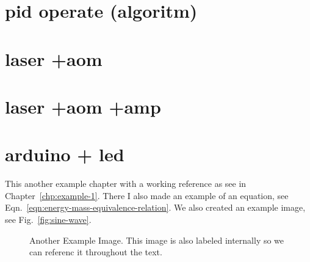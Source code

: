 \documentclass[\main/master.tex]{subfiles}
\begin{document}
\section{pid operate (algoritm)}
\section{laser +aom}
\section{laser +aom +amp}
\section{arduino + led}
\doublespacing
\hspace{5 mm} This another example chapter with a working reference as see in Chapter~\ref{chp:example-1}. There I also made an example of an equation, see Eqn.~\ref{eqn:energy-mass-equivalence-relation}. We also created an example image, see Fig.~\ref{fig:sine-wave}.
\begin{figure}[htbp]
	\centering
	\caption[Another Example Image]{Another Example Image. This image is also labeled internally so we can referenc it throughout the text.}
	\label{fig:cosine-wave}
\end{figure}
\end{document}
